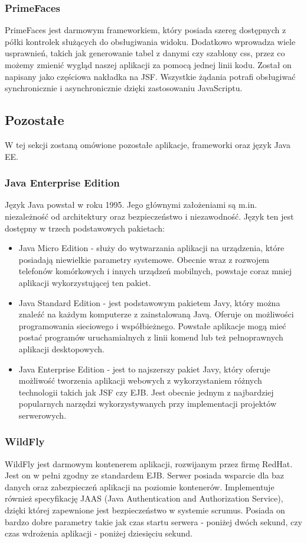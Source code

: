 \subsubsection{PrimeFaces}
PrimeFaces jest darmowym frameworkiem, który posiada szereg dostępnych z półki kontrolek służących do obsługiwania widoku. Dodatkowo wprowadza wiele usprawnień, takich jak generowanie tabel z danymi czy szablony css, przez co możemy zmienić wygląd naszej aplikacji za pomocą jednej linii kodu. Został on napisany jako częściowa nakładka na JSF. Wszystkie żądania potrafi obsługiwać synchronicznie i asynchronicznie dzięki zastosowaniu JavaScriptu.

\subsection{Pozostałe}
W tej sekcji zostaną omówione pozostałe aplikacje, frameworki oraz język Java EE.

\subsubsection{Java Enterprise Edition}
Język Java powstał w roku 1995. Jego głównymi założeniami są m.in. niezależność od architektury oraz bezpieczeństwo i niezawodność. Język ten jest dostępny w trzech podstawowych pakietach:
\begin{itemize}
	\item Java Micro Edition - służy do wytwarzania aplikacji na urządzenia, które posiadają niewielkie parametry systemowe. Obecnie wraz z rozwojem telefonów komórkowych i innych urządzeń mobilnych, powstaje coraz mniej aplikacji wykorzystującej ten pakiet.
	\item Java Standard Edition - jest podstawowym pakietem Javy, który można znaleźć na każdym komputerze z zainstalowaną Javą. Oferuje on możliwości programowania sieciowego i współbieżnego. Powstałe aplikacje mogą mieć postać programów uruchamialnych z linii komend lub też pełnoprawnych aplikacji desktopowych.
	\item Java Enterprise Edition - jest to najszerszy pakiet Javy, który oferuje możliwość tworzenia aplikacji webowych z wykorzystaniem różnych technologii takich jak JSF czy EJB. Jest obecnie jednym z najbardziej popularnych narzędzi wykorzystywanych przy implementacji projektów serwerowych.
\end{itemize}

\subsubsection{WildFly}
WildFly jest darmowym kontenerem aplikacji, rozwijanym przez firmę RedHat. Jest on w pełni zgodny ze standardem EJB. Serwer posiada wsparcie dla baz danych oraz zabezpieczeń aplikacji na poziomie kontenerów. Implementuje również specyfikację JAAS (Java Authentication and Authorization Service), dzięki której zapewnione jest bezpieczeństwo w systemie scrumus. Posiada on bardzo dobre parametry takie jak czas startu serwera - poniżej dwóch sekund, czy czas wdrożenia aplikacji - poniżej dziesięciu sekund.

